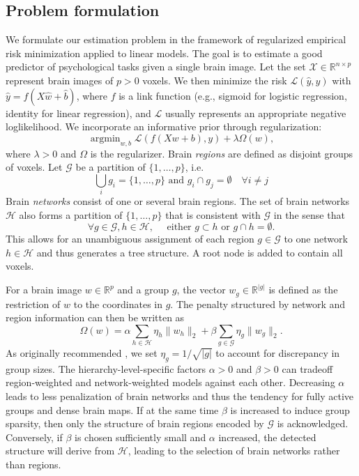 \documentclass[runningheads,a4paper]{llncs}
\DeclareMathOperator{\argmin}{argmin}
\begin{document}
\subsection{Problem formulation}
We formulate our estimation problem in the framework of regularized
empirical risk
minimization applied to linear models.
The goal is to estimate a good predictor of psychological tasks
given a single brain image. Let the set \(\mathcal X\in\mathbb{R}^{n \times p}\) represent brain
images of \(p > 0\) voxels.
We then minimize the risk \(\mathcal L(\hat y, y)\) with
\(\hat y = f(X\hat w + \hat b)\), where \(f\) is a link function 
(e.g., sigmoid for logistic regression, identity for linear regression),
and \(\mathcal L\) usually represents an appropriate negative loglikelihood.
We incorporate an informative prior through regularization:
\[\argmin_{w, b} \mathcal L(f(Xw + b), y) + \lambda\Omega(w),\]
where \(\lambda > 0\) and \(\Omega\) is the regularizer.
Brain \textit{regions} are defined as disjoint groups of voxels. Let \(\mathcal G\)
be a partition of \(\{1, \dots, p\}\), i.e.
\[  \bigcup_{i} g_i = \{1, \dots, p\} \textrm{ and } g_i\cap g_j=\emptyset
\quad\forall i\not=j\]
Brain \textit{networks} consist of one or several brain regions.
The set of brain networks \(\mathcal{H}\) also forms a partition of 
\(\{1, \dots, p\}\) that is consistent with \(\mathcal G\) in
the sense that
\[\forall g\in\mathcal G, h\in\mathcal H,\quad
\textrm{ either } g\subset h\textrm{ or }g\cap h = \emptyset.\]
This allows for an unambiguous assignment of each region \(g\in\mathcal G\) to one
network \(h\in\mathcal H\) and thus generates a tree structure.
A root node is added to contain all voxels.

For a brain image \(w\in\mathbb{R}^p\) and a group \(g\), the vector 
\(w_g\in\mathbb{R}^{|g|}\) is defined as the restriction of \(w\) to the coordinates
 in \(g\). The penalty structured by network
and region information can then be written as
\[\Omega(w) = \alpha\sum_{h\in\mathcal H}\eta_h\|w_h\|_2 + \beta\sum_{g\in\mathcal G}\eta_g\|w_g\|_2.\]
As originally recommended \cite{yuan2006model},
we set \(\eta_g = 1/\sqrt{|g|}\) to
account for discrepancy in group sizes. The hierarchy-level-specific factors 
\(\alpha > 0\) and \(\beta > 0\) can tradeoff region-weighted and
network-weighted models against each other.
Decreasing \(\alpha\) leads to less 
penalization of brain networks and thus the tendency for fully active groups
and dense brain maps. If at the same time \(\beta\) is increased to 
induce group sparsity, then only the structure of brain regions encoded
by \(\mathcal G\) is acknowledged. Conversely, if \(\beta\) is chosen 
sufficiently small and \(\alpha\) increased,
the detected structure will derive from \(\mathcal H\), leading to the
selection of brain networks rather than regions.
\end{document}
